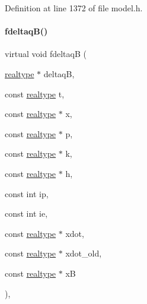 Definition at line 1372 of file model.\+h.

\mbox{\label{classamici_1_1_model_ad2cecb9a4b98d420a4ba6f2aa716bbec}} 
\paragraph{\texorpdfstring{fdeltaq\+B()}{fdeltaqB()}\hspace{0.1cm}{\footnotesize\ttfamily [2/2]}}
{\footnotesize\ttfamily virtual void fdeltaqB (\begin{DoxyParamCaption}\item[{\mbox{\hyperlink{namespaceamici_a1bdce28051d6a53868f7ccbf5f2c14a3}{realtype}} $\ast$}]{deltaqB,  }\item[{const \mbox{\hyperlink{namespaceamici_a1bdce28051d6a53868f7ccbf5f2c14a3}{realtype}}}]{t,  }\item[{const \mbox{\hyperlink{namespaceamici_a1bdce28051d6a53868f7ccbf5f2c14a3}{realtype}} $\ast$}]{x,  }\item[{const \mbox{\hyperlink{namespaceamici_a1bdce28051d6a53868f7ccbf5f2c14a3}{realtype}} $\ast$}]{p,  }\item[{const \mbox{\hyperlink{namespaceamici_a1bdce28051d6a53868f7ccbf5f2c14a3}{realtype}} $\ast$}]{k,  }\item[{const \mbox{\hyperlink{namespaceamici_a1bdce28051d6a53868f7ccbf5f2c14a3}{realtype}} $\ast$}]{h,  }\item[{const int}]{ip,  }\item[{const int}]{ie,  }\item[{const \mbox{\hyperlink{namespaceamici_a1bdce28051d6a53868f7ccbf5f2c14a3}{realtype}} $\ast$}]{xdot,  }\item[{const \mbox{\hyperlink{namespaceamici_a1bdce28051d6a53868f7ccbf5f2c14a3}{realtype}} $\ast$}]{xdot\+\_\+old,  }\item[{const \mbox{\hyperlink{namespaceamici_a1bdce28051d6a53868f7ccbf5f2c14a3}{realtype}} $\ast$}]{xB }\end{DoxyParamCaption})\hspace{0.3cm}{\ttfamily [protected]}, {\ttfamily [virtual]}}

